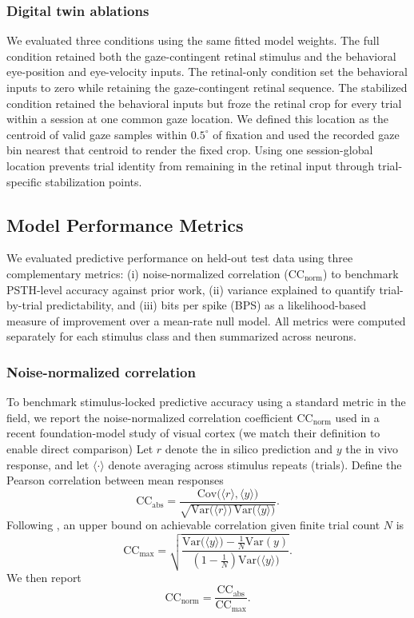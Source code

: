 \documentclass{lite}
\begin{document}
\subsubsection{Digital twin ablations}
We evaluated three conditions using the same fitted model weights. The full condition retained both the gaze-contingent retinal stimulus and the behavioral eye-position and eye-velocity inputs. The retinal-only condition set the behavioral inputs to zero while retaining the gaze-contingent retinal sequence. The stabilized condition retained the behavioral inputs but froze the retinal crop for every trial within a session at one common gaze location. We defined this location as the centroid of valid gaze samples within $0.5^\circ$ of fixation and used the recorded gaze bin nearest that centroid to render the fixed crop. Using one session-global location prevents trial identity from remaining in the retinal input through trial-specific stabilization points.

\subsection{Model Performance Metrics}
We evaluated predictive performance on held-out test data using three complementary metrics:
(i) noise-normalized correlation ($\mathrm{CC}_{\mathrm{norm}}$) to benchmark PSTH-level accuracy against prior work,
(ii) variance explained to quantify trial-by-trial predictability, and
(iii) bits per spike (BPS) as a likelihood-based measure of improvement over a mean-rate null model.
All metrics were computed separately for each stimulus class and then summarized across neurons.

\subsubsection{Noise-normalized correlation}
To benchmark stimulus-locked predictive accuracy using a standard metric in the field, we report the
noise-normalized correlation coefficient $\mathrm{CC}_{\mathrm{norm}}$ used in a recent foundation-model study of visual cortex
(we match their definition to enable direct comparison)
Let $r$ denote the in silico prediction and $y$ the in vivo response, and let $\langle \cdot \rangle$ denote averaging across stimulus repeats (trials).
Define the Pearson correlation between mean responses
\begin{equation}
\mathrm{CC}_{\mathrm{abs}}
=
\frac{\mathrm{Cov}\!\big(\langle r \rangle,\langle y \rangle\big)}
{\sqrt{\mathrm{Var}\!\big(\langle r \rangle\big)\,\mathrm{Var}\!\big(\langle y \rangle\big)}}.
\end{equation}
Following \cite{schoppe2016measuring}, an upper bound on achievable correlation given finite trial count $N$ is
\begin{equation}
\mathrm{CC}_{\max}
=
\sqrt{
\frac{\mathrm{Var}\!\big(\langle y \rangle\big)-\frac{1}{N}\mathrm{Var}(y)}
{\left(1-\frac{1}{N}\right)\mathrm{Var}\!\big(\langle y \rangle\big)}
}.
\end{equation}
We then report
\begin{equation}
\mathrm{CC}_{\mathrm{norm}}
=
\frac{\mathrm{CC}_{\mathrm{abs}}}{\mathrm{CC}_{\max}}.
\end{equation}
\end{document}
